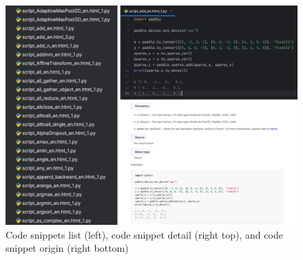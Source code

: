 \documentclass[sigconf]{acmart}
\begin{document}
    \begin{figure}[h]
      \centering
      \includegraphics[width=\linewidth]{2.png}
      \caption{Code snippets list (left), code snippet detail (right top), and code snippet origin (right bottom)}
    \end{figure}  
    
\end{document}
